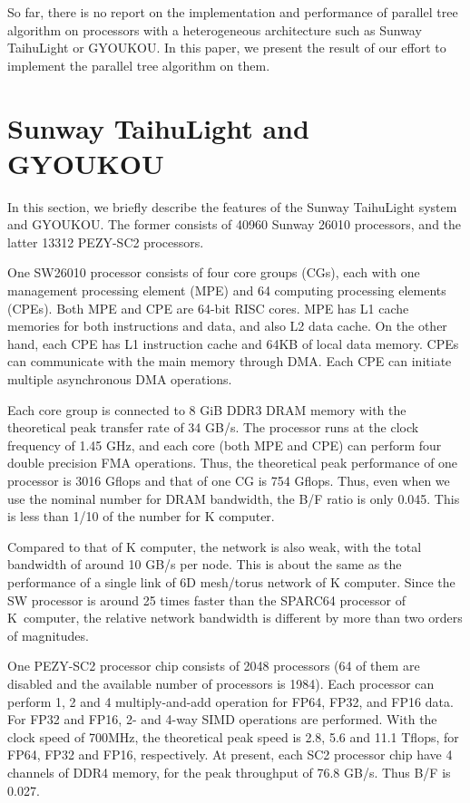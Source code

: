 \documentclass[conference]{IEEEtran}
\begin{document}
So far, there is no report on the implementation and performance of
parallel tree algorithm on processors with a heterogeneous
architecture such as Sunway TaihuLight or GYOUKOU.  In this paper, we
present the result of our effort to implement the parallel tree
algorithm on them.


\section{Sunway TaihuLight and GYOUKOU}

In this section, we briefly describe the features of the Sunway
TaihuLight system and GYOUKOU. The former consists of 40960 Sunway 26010
processors, and the latter 13312 PEZY-SC2 processors. 

One SW26010 processor consists of four core groups (CGs), each with one
management processing element (MPE) and 64 computing processing elements (CPEs). 
Both MPE and CPE are 64-bit RISC cores. MPE has L1 cache
memories for  both instructions and data, and also L2 data cache. On
the other hand, each CPE has L1 instruction cache and 64KB of local
data memory. CPEs can communicate with the main memory through DMA.
Each CPE can initiate multiple asynchronous DMA operations. 

Each core group is connected to 8 GiB DDR3 DRAM memory with the theoretical
peak transfer rate of 34 GB/s. The processor runs at the clock
frequency of 1.45 GHz, and each core (both MPE and CPE) can perform
four double precision FMA operations. Thus, the theoretical peak
performance of one processor is 3016 Gflops and that of one CG is 754
Gflops. Thus, even when we use the nominal number for DRAM bandwidth,
the B/F ratio is only 0.045. This is less than 1/10 of the number for
K computer.

Compared to that of K computer, the network is also  weak,
with the total bandwidth of around 10 GB/s per node. This is about the
same as the performance of a single link of 6D mesh/torus network of K
computer. Since the SW processor is around 25 times faster than the
SPARC64 processor of K~computer, the relative network bandwidth is
different by  more than two orders of magnitudes.

One PEZY-SC2 processor chip consists of  2048 processors (64
of them are disabled and the available number of processors is
1984). Each processor can perform 1, 2 and 4 multiply-and-add
operation for FP64, FP32, and FP16 data. For FP32 and FP16, 2- and
4-way SIMD operations are performed.  With the clock speed of 700MHz,
the theoretical peak speed is 2.8, 5.6 and 11.1 Tflops, for FP64, FP32 and
FP16, respectively. At present, each SC2 processor chip have 4 channels of
DDR4 memory, for the peak throughput of 76.8 GB/s. Thus B/F is 0.027.
\end{document}
